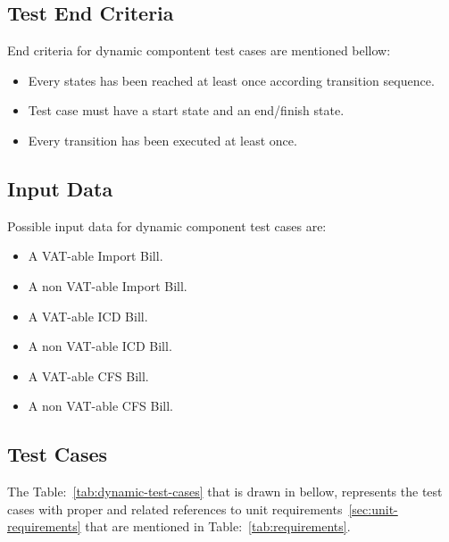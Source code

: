 \documentclass[12pt]{article}
\begin{document}
\subsection{Test End Criteria}
End criteria for dynamic compontent test cases are mentioned bellow\cite{Spillner:Linz:Schaefer:2014}:

\begin{itemize}
	
    \item Every states has been reached at least once according transition sequence.
    
    \item Test case must have a start state and an end/finish state.
    
    \item Every transition has been executed at least once.\cite{Spillner:Linz:Schaefer:2014}

\end{itemize}

\subsection{Input Data}
Possible input data for dynamic component test cases are:

\begin{itemize}

	\item A VAT\--able Import Bill.
    
    \item A non VAT\--able Import Bill.
    
    \item A VAT\--able ICD Bill.
    
    \item A non VAT\--able ICD Bill.
    
    \item A VAT\--able CFS Bill.
    
    \item A non VAT\--able CFS Bill.

\end{itemize}

\subsection{Test Cases}
The Table:~\ref{tab:dynamic-test-cases} that is drawn in bellow, represents the test cases with proper and related references to unit requirements~\ref{sec:unit-requirements} that are mentioned in Table:~\ref{tab:requirements}. \\
\end{document}
